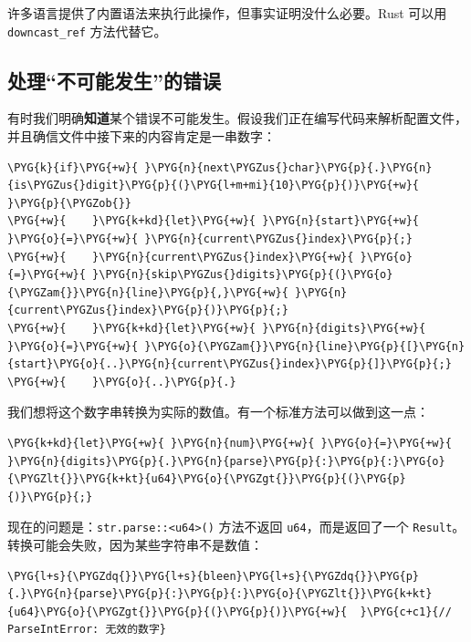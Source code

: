 许多语言提供了内置语法来执行此操作，但事实证明没什么必要。Rust 可以用 \texttt{downcast\_ref} 方法代替它。

\subsection{处理“不可能发生”的错误}

有时我们明确\textbf{知道}某个错误不可能发生。假设我们正在编写代码来解析配置文件，并且确信文件中接下来的内容肯定是一串数字：

\begin{Verbatim}[commandchars=\\\{\},breaklines=true,breakanywhere=true,fontsize=\codefont,xleftmargin=17bp]
\PYG{k}{if}\PYG{+w}{ }\PYG{n}{next\PYGZus{}char}\PYG{p}{.}\PYG{n}{is\PYGZus{}digit}\PYG{p}{(}\PYG{l+m+mi}{10}\PYG{p}{)}\PYG{+w}{ }\PYG{p}{\PYGZob{}}
\PYG{+w}{    }\PYG{k+kd}{let}\PYG{+w}{ }\PYG{n}{start}\PYG{+w}{ }\PYG{o}{=}\PYG{+w}{ }\PYG{n}{current\PYGZus{}index}\PYG{p}{;}
\PYG{+w}{    }\PYG{n}{current\PYGZus{}index}\PYG{+w}{ }\PYG{o}{=}\PYG{+w}{ }\PYG{n}{skip\PYGZus{}digits}\PYG{p}{(}\PYG{o}{\PYGZam{}}\PYG{n}{line}\PYG{p}{,}\PYG{+w}{ }\PYG{n}{current\PYGZus{}index}\PYG{p}{)}\PYG{p}{;}
\PYG{+w}{    }\PYG{k+kd}{let}\PYG{+w}{ }\PYG{n}{digits}\PYG{+w}{ }\PYG{o}{=}\PYG{+w}{ }\PYG{o}{\PYGZam{}}\PYG{n}{line}\PYG{p}{[}\PYG{n}{start}\PYG{o}{..}\PYG{n}{current\PYGZus{}index}\PYG{p}{]}\PYG{p}{;}
\PYG{+w}{    }\PYG{o}{..}\PYG{p}{.}
\end{Verbatim}

我们想将这个数字串转换为实际的数值。有一个标准方法可以做到这一点：

\begin{Verbatim}[commandchars=\\\{\},breaklines=true,breakanywhere=true,fontsize=\codefont,xleftmargin=17bp]
\PYG{k+kd}{let}\PYG{+w}{ }\PYG{n}{num}\PYG{+w}{ }\PYG{o}{=}\PYG{+w}{ }\PYG{n}{digits}\PYG{p}{.}\PYG{n}{parse}\PYG{p}{:}\PYG{p}{:}\PYG{o}{\PYGZlt{}}\PYG{k+kt}{u64}\PYG{o}{\PYGZgt{}}\PYG{p}{(}\PYG{p}{)}\PYG{p}{;}
\end{Verbatim}

现在的问题是：\texttt{str.parse::<u64>()} 方法不返回 \texttt{u64}，而是返回了一个 \texttt{Result}。转换可能会失败，因为某些字符串不是数值：

\begin{Verbatim}[commandchars=\\\{\},breaklines=true,breakanywhere=true,fontsize=\codefont,xleftmargin=17bp]
\PYG{l+s}{\PYGZdq{}}\PYG{l+s}{bleen}\PYG{l+s}{\PYGZdq{}}\PYG{p}{.}\PYG{n}{parse}\PYG{p}{:}\PYG{p}{:}\PYG{o}{\PYGZlt{}}\PYG{k+kt}{u64}\PYG{o}{\PYGZgt{}}\PYG{p}{(}\PYG{p}{)}\PYG{+w}{  }\PYG{c+c1}{// ParseIntError: 无效的数字}
\end{Verbatim}

